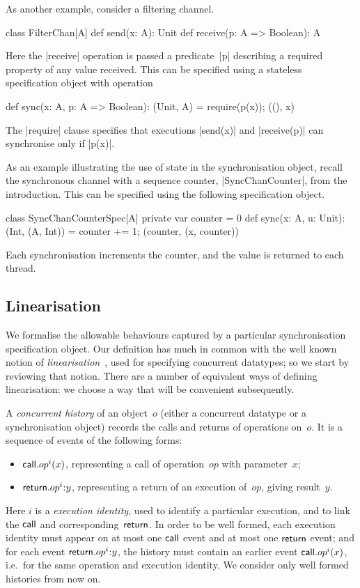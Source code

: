 As another example, consider a filtering channel.
\begin{scala}
class FilterChan[A]{
  def send(x: A): Unit
  def receive(p: A => Boolean): A
}
\end{scala}
%
Here the |receive| operation is passed a predicate~|p| describing a required
property of any value received.  This can be specified using a stateless
specification object with operation
%
\begin{scala}
def sync(x: A, p: A => Boolean): (Unit, A) = { require(p(x)); ((), x) }
\end{scala}
%
The |require| clause specifies that executions |send(x)| and |receive(p)| can
synchronise only if |p(x)|.

As an example illustrating the use of state in the synchronisation object,
recall the synchronous channel with a sequence counter, |SyncChanCounter|,
from the introduction.  This can be specified using the following
specification object.
%
\begin{scala}
class SyncChanCounterSpec[A]{
  private var counter = 0
  def sync(x: A, u: Unit): (Int, (A, Int)) = {
    counter += 1; (counter, (x, counter))
  }
}
\end{scala}
%
Each synchronisation increments the counter, and the value is returned to each
thread. 


\subsection{Linearisation}
\label{sec:specification-linearisability}

We formalise the allowable behaviours captured by a particular synchronisation
specification object.  Our definition has much in common with the well known
notion of \emph{linearisation}~\cite{herlihy-wing}, used for specifying
concurrent datatypes; so we start by reviewing that notion.  There are a
number of equivalent ways of defining linearisation: we choose a way that will
be convenient subsequently.

A \emph{concurrent history} of an object~$o$ (either a concurrent datatype or
a synchronisation object) records the calls and returns of operations on~$o$.
It is a sequence of events of the following forms:
%
\begin{itemize}
\item $\mathsf{call}.op^i(x)$, representing a call of operation~$op$ with
  parameter~$x$;
\item $\return.op^i \:: y$, representing a return of an execution of~$op$,
  giving result~$y$.
\end{itemize}
%
Here $i$ is a \emph{execution identity}, used to identify a particular
execution, and to link the $\mathsf{call}$ and corresponding~$\mathsf{return}$.  In order to
be well formed, each execution identity must appear on at most one $\mathsf{call}$
event and at most one $\mathsf{return}$ event; and for each event $\return.op^i\::y$,
the history must contain an earlier event $\mathsf{call}.op^i(x)$, i.e.~for the same
operation and execution identity.  We consider only well formed histories
from now on.  

